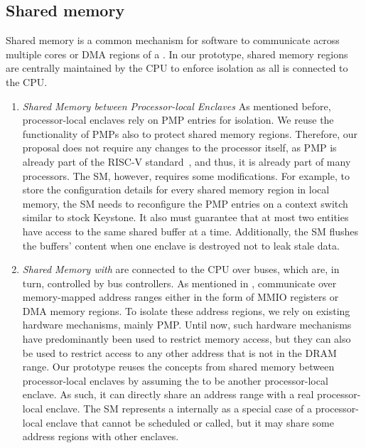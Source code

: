 
\subsection{Shared memory}
\label{sec:approach:sharedMemory}
Shared memory is a common mechanism for software to communicate across multiple cores or DMA regions of a \sphw. In our prototype, shared memory regions are centrally maintained by the CPU to enforce isolation as all \sphw is connected to the CPU.


\begin{enumerate}
\item\emph{Shared Memory between Processor-local Enclaves}
As mentioned before, processor-local enclaves rely on PMP entries for isolation. We reuse the functionality of PMPs also to protect shared memory regions. Therefore, our proposal does not require any changes to the processor itself, as PMP is already part of the RISC-V standard~\cite{riscv2019privspec}, and thus, it is already part of many processors. The SM, however, requires some modifications. For example, to store the configuration details for every shared memory region in local memory, the SM needs to reconfigure the PMP entries on a context switch similar to stock Keystone. It also must guarantee that at most two entities have access to the same shared buffer at a time. Additionally, the SM flushes the buffers' content when one enclave is destroyed not to leak stale data. 


\item\emph{Shared Memory with \sphw} \Sphw are connected to the CPU over buses, which are, in turn, controlled by bus controllers. As mentioned in , \sphw communicate over memory-mapped address ranges either in the form of MMIO registers or DMA memory regions. To isolate these address regions, we rely on existing hardware mechanisms, mainly PMP. Until now, such hardware mechanisms have predominantly been used to restrict memory access, but they can also be used to restrict access to any other address that is not in the DRAM range. Our prototype reuses the concepts from shared memory between processor-local enclaves by assuming the \sphw to be another processor-local enclave. As such, it can directly share an address range with a real processor-local enclave. The SM represents a \sphw internally as a special case of a processor-local enclave that cannot be scheduled or called, but it may share some address regions with other enclaves. 

\end{enumerate}

